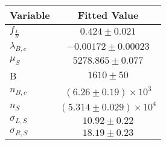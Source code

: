 \begin{tabular}[t]{lc}
\hline
Variable &Fitted Value\\
\hline\hline
$f_{\frac{L}{R}}$&$0.424\pm0.021$\\
\hline
$\lambda_{B,c}$&$-0.00172\pm0.00023$\\
\hline
$\mu_S$&$5278.865\pm0.077$\\
\hline
B&$1610\pm50$\\
\hline
$n_{B,c}$&$(6.26\pm0.19)\times 10^3$\\
\hline
$n_S$&$(5.314\pm0.029)\times 10^4$\\
\hline
$\sigma_{L, S}$&$10.92\pm0.22$\\
\hline
$\sigma_{R, S}$&$18.19\pm0.23$\\
\hline
\end{tabular}